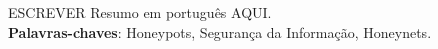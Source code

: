 \par
\begin{resumo}
ESCREVER Resumo em português AQUI.
\vspace{\onelineskip} \\

\noindent
\textbf{Palavras-chaves}: Honeypots, Segurança da Informação, Honeynets.
\end{resumo}
